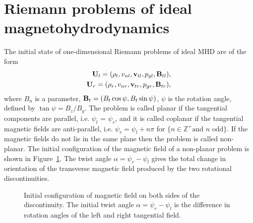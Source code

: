 \section[Riemann problems of ideal magnetohydrodynamics]{Riemann problems of ideal magnetohydrodynamics}
\label{sec:riemann_mhd}

The initial state of one-dimensional Riemann problems of ideal MHD are of the form
\begin{gather}
\begin{split}
\label{eqn:init_mhd}
\mathbf{U}_l = (\rho_l,v_{nl},\mathbf{v}_{tl},p_{gl},\mathbf{B}_{tl}), \\
\mathbf{U}_r = (\rho_r,v_{nr},\mathbf{v}_{tr},p_{gr},\mathbf{B}_{tr}),
\end{split}
\end{gather}
where $B_n$ is a parameter, $\mathbf{B}_{t} = (B_{t}\cos\psi,B_{t}\sin\psi)$, $\psi$ is the rotation angle, defined by $\tan\psi = B_z/B_y$.  The problem is called planar if the tangential components are parallel, i.e. $\psi_l$ = $\psi_r$, and it is called coplanar if the tangential magnetic fields are anti-parallel, i.e. $\psi_r = \psi_l + n\pi$ for $\{n\in \mathbb{Z}^+ \text{and } n \text { odd} \}$.  If the magnetic fields do not lie in the same plane then the problem is called non-planar.  The initial configuration of the magnetic field of a non-planar problem is shown in Figure~\ref{fig:bfield_init}.  The twist angle $\alpha = \psi_r - \psi_l$ gives the total change in orientation of the transverse magnetic field produced by the two rotational discontinuities.  

\begin{figure}[htbp] 
\begin{center}

\end{center}
\caption{Initial configuration of magnetic field on both sides of the discontinuity.  The initial twist angle $\alpha = \psi_r - \psi_l$ is the difference in rotation angles of the left and right tangential field.}
\label{fig:bfield_init}
\end{figure}

